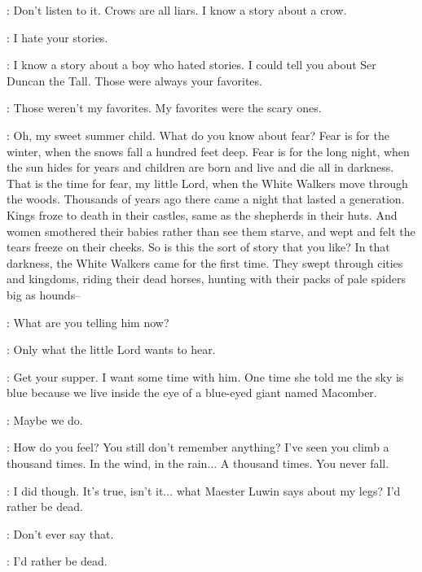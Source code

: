 \scene



\OLDNAN: Don't listen to it. Crows are all liars. I know a story about a crow. 

\BRAN: I hate your stories. 

\OLDNAN: I know a story about a boy who hated stories. I could tell you about Ser Duncan the Tall. Those were always your favorites. 

\BRAN: Those weren't my favorites. My favorites were the scary ones. 

\OLDNAN: Oh, my sweet summer child. What do you know about fear? Fear is for the winter, when the snows fall a hundred feet deep. Fear is for the long night, when the sun hides for years and children are born and live and die all in darkness. That is the time for fear, my little Lord, when the White Walkers move through the woods. Thousands of years ago there came a night that lasted a generation. Kings froze to death in their castles, same as the shepherds in their huts. And women smothered their babies rather than see them starve, and wept and felt the tears freeze on their cheeks. So is this the sort of story that you like? In that darkness, the White Walkers came for the first time. They swept through cities and kingdoms, riding their dead horses, hunting with their packs of pale spiders big as hounds--


\ROBB: What are you telling him now? 

\OLDNAN: Only what the little Lord wants to hear. 

\ROBB: Get your supper. I want some time with him.  One time she told me the sky is blue because we live inside the eye of a blue-eyed giant named Macomber. 

\BRAN: Maybe we do. 

\ROBB: How do you feel? You still don't remember anything? I've seen you climb a thousand times. In the wind, in the rain$\ldots$ A thousand times. You never fall. 

\BRAN: I did though. It's true, isn't it$\ldots$ what Maester Luwin says about my legs? I'd rather be dead. 

\ROBB: Don't ever say that. 

\BRAN: I'd rather be dead. 

\scene

